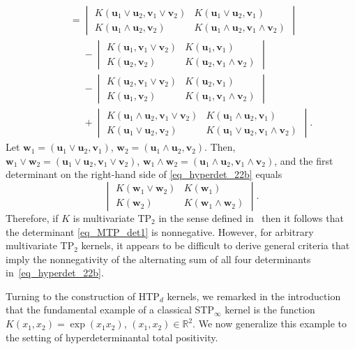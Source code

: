 \documentclass[10pt,a4paper]{amsart}
\numberwithin{equation}{section}
\def\R{{\mathbb R}}
\def\uu{\boldsymbol{u}}
\def\vv{\boldsymbol{v}}
\def\ww{\boldsymbol{w}}
\begin{document}
\begin{Example}
\begin{gather}
\qquad=
\begin{vmatrix}
K(\uu_1 \vee \uu_2,\vv_1 \vee \vv_2) & K(\uu_1 \vee \uu_2,\vv_1) \\
K(\uu_1 \wedge \uu_2,\vv_2) & K(\uu_1 \wedge \uu_2,\vv_1 \wedge \vv_2)
\end{vmatrix} \nonumber \\
\phantom{\qquad= }{} - \begin{vmatrix}
K(\uu_1,\vv_1 \vee \vv_2) & K(\uu_1,\vv_1) \\
K(\uu_2,\vv_2) & K(\uu_2,\vv_1 \wedge \vv_2)
\end{vmatrix} \nonumber \\
\phantom{\qquad= }{} - \begin{vmatrix}
K(\uu_2,\vv_1 \vee \vv_2) & K(\uu_2,\vv_1) \\
K(\uu_1,\vv_2) & K(\uu_1,\vv_1 \wedge \vv_2)
\end{vmatrix} \nonumber \\
\phantom{\qquad= }{} + \begin{vmatrix}
K(\uu_1 \wedge \uu_2,\vv_1 \vee \vv_2) & K(\uu_1 \wedge \uu_2,\vv_1) \\
K(\uu_1 \vee \uu_2,\vv_2) & K(\uu_1 \vee \uu_2,\vv_1 \wedge \vv_2)
\end{vmatrix} .\label{eq_hyperdet_22b}
\end{gather}
Let $\ww_1 = (\uu_1 \vee \uu_2,\vv_1)$, $\ww_2 = (\uu_1 \wedge \uu_2,\vv_2)$. Then, $\ww_1 \vee \ww_2 = (\uu_1 \vee \uu_2,\vv_1 \vee \vv_2)$, $\ww_1 \wedge \ww_2 = (\uu_1 \wedge \uu_2,\vv_1 \wedge \vv_2)$, and the first determinant on the right-hand side of \eqref{eq_hyperdet_22b} equals
\begin{equation}
\label{eq_MTP_det1}
\begin{vmatrix}
K(\ww_1 \vee \ww_2) & K(\ww_1) \\
K(\ww_2) & K(\ww_1 \wedge \ww_2)
\end{vmatrix}.
\end{equation}
Therefore, if $K$ is multivariate TP$_2$ in the sense defined in~\cite{karlinrinott80} then it follows that the determinant \eqref{eq_MTP_det1} is nonnegative. However, for arbitrary multivariate TP$_2$ kernels, it appears to be difficult to derive general criteria that imply the nonnegativity of the alternating sum of all four determinants in~\eqref{eq_hyperdet_22b}.
\end{Example}

Turning to the construction of HTP$_d$ kernels, we remarked in the introduction that the fundamental example of a classical STP$_\infty$ kernel is the function $K(x_1,x_2) = \exp(x_1 x_2)$, $(x_1,x_2) \in \R^2$. We now generalize this example to the setting of hyperdeterminantal total positivity.
\end{document}
